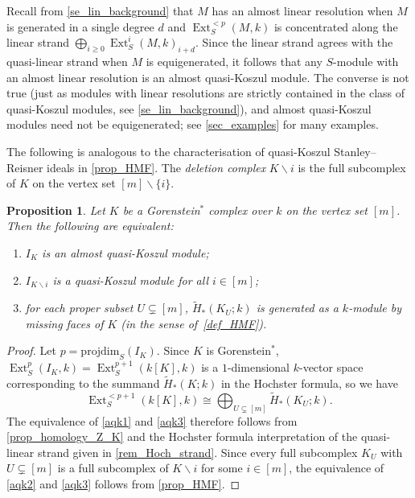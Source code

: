 \documentclass[a4paper,10pt]{amsart}
\newtheorem{proposition}[theorem]{Proposition}
\theoremstyle{definition}
\theoremstyle{remark}
\newcommand{\pd}{\mathrm{projdim}}
\DeclareMathOperator{\Ext}{Ext}
\begin{document}
Recall from \cref{se_lin_background} that $M$ has an almost linear resolution when $M$ is generated in a single degree $d$ and $\Ext_S^{<p}(M,k)$ is concentrated along the linear strand $\bigoplus_{i\geqslant 0}\Ext_S^i(M,k)_{i+d}$. Since the linear strand agrees with the quasi-linear strand when $M$ is equigenerated, it follows that any $S$-module with an almost linear resolution is an almost quasi-Koszul module. The converse is not true (just as modules with linear resolutions are strictly contained in the class of quasi-Koszul modules, see \cref{se_lin_background}), and almost quasi-Koszul modules need not be equigenerated; see \cref{sec_examples} for many examples.

The following is analogous to the characterisation of quasi-Koszul Stanley--Reisner ideals in \cref{prop_HMF}. The \emph{deletion complex} $K\smallsetminus i$ is the full subcomplex of $K$ on the vertex set $[m]\smallsetminus\{i\}$.

\begin{proposition} \label{prop_almost_HMF}
Let $K$ be a Gorenstein$^*$ complex over $k$ on the vertex set $[m]$. Then the following are equivalent:
\begin{enumerate}[label={\normalfont(\alph*)}]
\item $I_K$ is an almost quasi-Koszul module; \label{aqk1}
\item $I_{K\smallsetminus i}$ is a quasi-Koszul module for all $i\in[m]$; \label{aqk2}
\item for each proper subset $U\subsetneq[m]$, $\widetilde{H}_*(K_U;k)$ is generated as a $k$-module by missing faces of $K$ (in the sense of~\cref{def_HMF}). \label{aqk3}
\end{enumerate}
\end{proposition}

\begin{proof}
Let $p=\pd_S(I_K)$. Since $K$ is Gorenstein$^*$, $\Ext_S^p(I_K,k)=\Ext_S^{p+1}(k[K],k)$ is a $1$-dimensional $k$-vector space corresponding to the summand $\widetilde{H}_*(K;k)$ in the Hochster formula, so we have
\[
\Ext_S^{<p+1}(k[K],k) \cong \bigoplus_{U\subsetneq[m]} \widetilde{H}_*(K_U;k).
\]
The equivalence of \ref{aqk1} and \ref{aqk3} therefore follows from \cref{prop_homology_Z_K} and the Hochster formula interpretation of the quasi-linear strand given in \cref{rem_Hoch_strand}. Since every full subcomplex $K_U$ with $U\subsetneq[m]$ is a full subcomplex of $K\smallsetminus i$ for some $i\in[m]$,  the equivalence of \ref{aqk2} and \ref{aqk3} follows from \cref{prop_HMF}. 
\end{proof}
\end{document}
